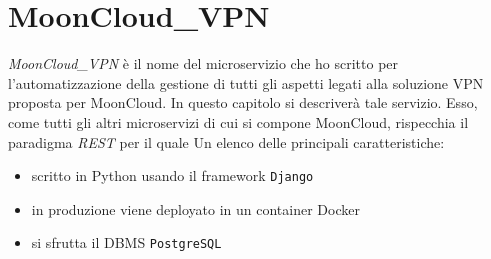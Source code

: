 \chapter{MoonCloud\_VPN}\label{ch:microservice}
\textit{MoonCloud\_VPN} è il nome del microservizio
che ho scritto per l'automatizzazione della gestione di tutti gli aspetti legati
alla soluzione VPN proposta per MoonCloud. In questo capitolo si descriverà tale
servizio.
Esso, come tutti gli altri microservizi di cui si compone MoonCloud, rispecchia
il paradigma \textit{REST} per il quale %
Un elenco delle principali caratteristiche:
\begin{itemize}
  \item scritto in Python usando il framework \texttt{Django}
  \item in produzione viene deployato in un container Docker
  \item si sfrutta il DBMS \texttt{PostgreSQL}
\end{itemize}



